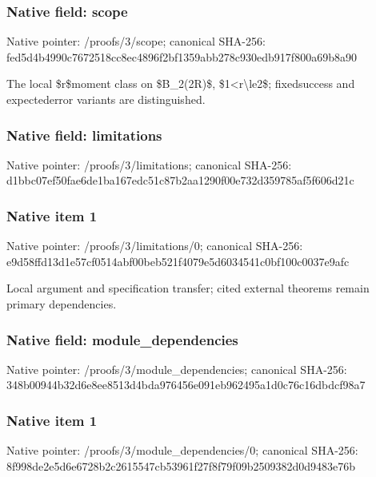 \documentclass[10pt,a4paper]{article}
\begin{document}
\subsubsection{Native field: scope}


Native pointer: /proofs/3/scope; canonical SHA-256: fed5d4b4990c7672518cc8ec\allowbreak{}4896f2bf1359abb278c930ed\allowbreak{}b917f800a69b8a90


The local \$r\$moment class on \$B\_2(2R)\$, \$1<r\textbackslash{}le2\$; fixedsuccess and expectederror variants are distinguished.


\subsubsection{Native field: limitations}


Native pointer: /proofs/3/limitations; canonical SHA-256: d1bbc07ef50fae6de1ba167e\allowbreak{}dc51c87b2aa1290f00e732d3\allowbreak{}59785af5f606d21c



\subsubsection{Native item 1}


Native pointer: /proofs/3/limitations/0; canonical SHA-256: e9d58ffd13d1e57cf0514abf\allowbreak{}00beb521f4079e5d6034541c\allowbreak{}0bf100c0037e9afc


Local argument and specification transfer; cited external theorems remain primary dependencies.


\subsubsection{Native field: module\_dependencies}


Native pointer: /proofs/3/module\_dependencies; canonical SHA-256: 348b00944b32d6e8ee8513d4\allowbreak{}bda976456e091eb962495a1d\allowbreak{}0c76c16dbdcf98a7



\subsubsection{Native item 1}


Native pointer: /proofs/3/module\_dependencies/0; canonical SHA-256: 8f998de2e5d6e6728b2c2615\allowbreak{}547cb53961f27f8f79f09b25\allowbreak{}09382d0d9483e76b
\end{document}
